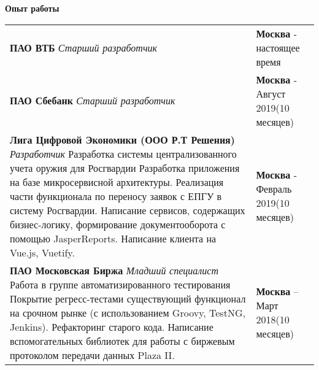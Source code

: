 \documentclass{article}
\begin{document}
\textbf{Опыт работы}
\begin{table}[h!]
\begin{center}

\def\arraystretch{2}%

\begin{tabular}
{ L{14cm} R{4cm} } \hhline{|=|=|}

\textbf{ПАО ВТБ}\newline
\emph{Старший разработчик}\newline

& \textbf{Москва} - настоящее время \\ 

\textbf{ПАО Сбебанк}\newline
\emph{Старший разработчик}\newline
& \textbf{Москва} - Август 2019\newline(10 месяцев) \\  

\textbf{Лига Цифровой Экономики (ООО Р.Т Решения)}\newline
\emph{Разработчик}\newline
Разработка системы централизованного учета оружия для Росгвардии\newline
Разработка приложения на базе микросервисной архитектуры. Реализация части функционала по переносу заявок с ЕПГУ в систему Росгвардии. Написание сервисов, содержащих бизнес-логику, формирование документооборота с помощью JasperReports. Написание клиента на Vue.js, Vuetify.
& \textbf{Москва} - Февраль 2019\newline(10 месяцев) \\ 

\textbf{ПАО Московская Биржа}\newline
\emph{Младший специалист}\newline
Работа в группе автоматизированного тестирования\newline
Покрытие регресс-тестами существующий функционал на срочном рынке (с использованием Groovy, TestNG, Jenkins). Рефакторинг старого кода. Написание вспомогательных библиотек для работы с биржевым протоколом передачи данных Plaza II.
& \textbf{Москва} – Март 2018\newline(10 месяцев) \\

\end{tabular}
\end{center}
\end{table}
\end{document}
